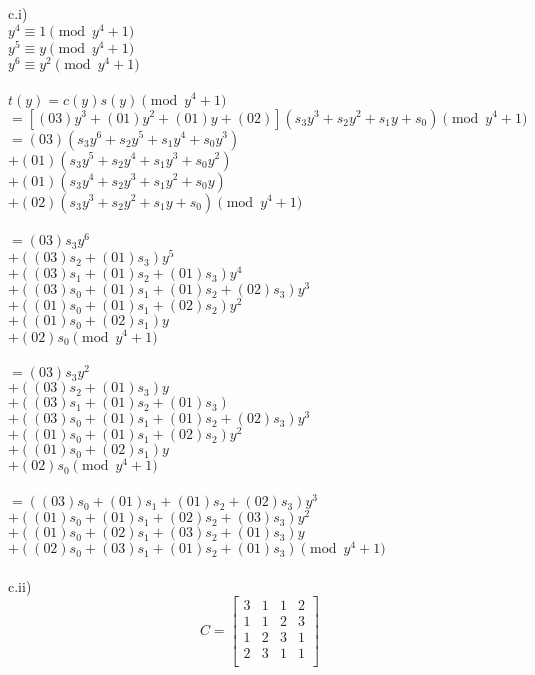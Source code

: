 \documentclass{assignment}
\begin{document}
\begin{problemlist}
\begin{problem}
\begin{answer}
c.i)\\
$y^4\equiv 1 \pmod {y^4+1}$\\
$y^5\equiv y \pmod {y^4+1}$\\
$y^6\equiv y^2 \pmod {y^4+1}$\\
\\
$t(y)=c(y)s(y) \pmod {y^4+1}$\\
$=[(03)y^3+(01)y^2+(01)y+(02)](s_3y^3+s_2y^2+s_1y+s_0) \pmod {y^4+1}$\\
$=(03)(s_3y^6+s_2y^5+s_1y^4+s_0y^3)$\\
$+(01)(s_3y^5+s_2y^4+s_1y^3+s_0y^2)$\\
$+(01)(s_3y^4+s_2y^3+s_1y^2+s_0y)$\\
$+(02)(s_3y^3+s_2y^2+s_1y+s_0) \pmod {y^4+1}$\\
\\
$=(03)s_3y^6$\\
$+((03)s_2+(01)s_3)y^5$\\
$+((03)s_1+(01)s_2+(01)s_3)y^4$\\
$+((03)s_0+(01)s_1+(01)s_2+(02)s_3)y^3$\\
$+((01)s_0+(01)s_1+(02)s_2)y^2$\\
$+((01)s_0+(02)s_1)y$\\
$+(02)s_0 \pmod {y^4+1}$\\
\\
$=(03)s_3y^2$\\
$+((03)s_2+(01)s_3)y$\\
$+((03)s_1+(01)s_2+(01)s_3)$\\
$+((03)s_0+(01)s_1+(01)s_2+(02)s_3)y^3$\\
$+((01)s_0+(01)s_1+(02)s_2)y^2$\\
$+((01)s_0+(02)s_1)y$\\
$+(02)s_0 \pmod {y^4+1}$\\
\\
$=((03)s_0+(01)s_1+(01)s_2+(02)s_3)y^3$\\
$+((01)s_0+(01)s_1+(02)s_2+(03)s_3)y^2$\\
$+((01)s_0+(02)s_1+(03)s_2+(01)s_3)y$\\
$+((02)s_0+(03)s_1+(01)s_2+(01)s_3) \pmod {y^4+1}$\\
\\
c.ii)\\
\[
C=
\begin{bmatrix}
3 & 1 & 1 & 2 \\
1 & 1 & 2 & 3\\
1 & 2 & 3 & 1\\
2 & 3 & 1 & 1\\
\end{bmatrix}
\]
\\
\end{answer}
\end{problem}


\end{problemlist}
\end{document}
